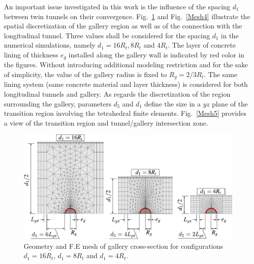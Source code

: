 \documentclass[a4paper,fleqn]{cas-sc}
\begin{document}
An important issue investigated in this work is the influence of the spacing $d_1$ between twin tunnels on their convergence. Fig.~\ref{Mesh3} and Fig.~\ref{Mesh4} illustrate the spatial discretization of the gallery region as well as of the connection with the longitudinal tunnel. Three values shall be considered for the spacing $d_1$ in the numerical simulations, namely  $d_1 = 16R_t, 8R_t$ and $4R_t$. The layer of concrete lining of thickness $e_g$ installed along the gallery wall is indicated by red color in the figures. Without introducing additional modeling restriction and for the sake of simplicity, the value of the gallery radius is fixed to $R_g = 2/3R_t$. The same lining system (same concrete material and layer thickness) is considered for both longitudinal tunnels and gallery. As regards the discretization of the region surrounding the gallery, parameters $d_5$ and $d_1$ define the size in a $yz$ plane of the transition region involving the tetrahedral finite elements. Fig.~\ref{Mesh5} provides a view of the transition region and tunnel/gallery intersection zone.
\begin{figure}[h!]
	\centering
	\includegraphics[scale=0.8]{Mesh3.pdf}
	\caption{Geometry and F.E mesh of gallery cross-section for configurations $d_1=16R_t$, $d_1=8R_t$ and $d_1=4R_t$.}
	\label{Mesh3}
\end{figure}
\end{document}
